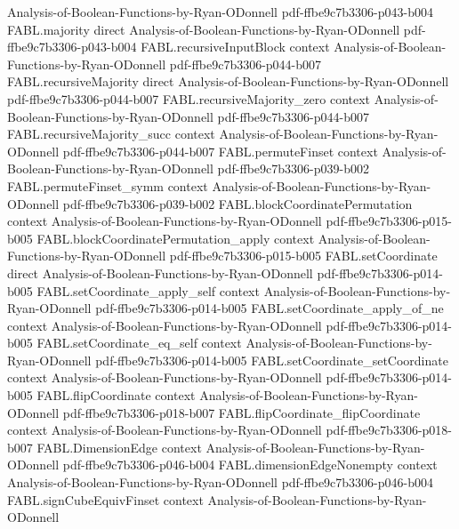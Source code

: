\begin{theorem}
  {Analysis-of-Boolean-Functions-by-Ryan-ODonnell}
  {pdf-ffbe9c7b3306-p043-b004}
\proofstep
  {FABL.majority}
  {direct}
  {Analysis-of-Boolean-Functions-by-Ryan-ODonnell}
  {pdf-ffbe9c7b3306-p043-b004}
\proofstep
  {FABL.recursiveInputBlock}
  {context}
  {Analysis-of-Boolean-Functions-by-Ryan-ODonnell}
  {pdf-ffbe9c7b3306-p044-b007}
\proofstep
  {FABL.recursiveMajority}
  {direct}
  {Analysis-of-Boolean-Functions-by-Ryan-ODonnell}
  {pdf-ffbe9c7b3306-p044-b007}
\proofstep
  {FABL.recursiveMajority_zero}
  {context}
  {Analysis-of-Boolean-Functions-by-Ryan-ODonnell}
  {pdf-ffbe9c7b3306-p044-b007}
\proofstep
  {FABL.recursiveMajority_succ}
  {context}
  {Analysis-of-Boolean-Functions-by-Ryan-ODonnell}
  {pdf-ffbe9c7b3306-p044-b007}
\proofstep
  {FABL.permuteFinset}
  {context}
  {Analysis-of-Boolean-Functions-by-Ryan-ODonnell}
  {pdf-ffbe9c7b3306-p039-b002}
\proofstep
  {FABL.permuteFinset_symm}
  {context}
  {Analysis-of-Boolean-Functions-by-Ryan-ODonnell}
  {pdf-ffbe9c7b3306-p039-b002}
\proofstep
  {FABL.blockCoordinatePermutation}
  {context}
  {Analysis-of-Boolean-Functions-by-Ryan-ODonnell}
  {pdf-ffbe9c7b3306-p015-b005}
\proofstep
  {FABL.blockCoordinatePermutation_apply}
  {context}
  {Analysis-of-Boolean-Functions-by-Ryan-ODonnell}
  {pdf-ffbe9c7b3306-p015-b005}
\proofstep
  {FABL.setCoordinate}
  {direct}
  {Analysis-of-Boolean-Functions-by-Ryan-ODonnell}
  {pdf-ffbe9c7b3306-p014-b005}
\proofstep
  {FABL.setCoordinate_apply_self}
  {context}
  {Analysis-of-Boolean-Functions-by-Ryan-ODonnell}
  {pdf-ffbe9c7b3306-p014-b005}
\proofstep
  {FABL.setCoordinate_apply_of_ne}
  {context}
  {Analysis-of-Boolean-Functions-by-Ryan-ODonnell}
  {pdf-ffbe9c7b3306-p014-b005}
\proofstep
  {FABL.setCoordinate_eq_self}
  {context}
  {Analysis-of-Boolean-Functions-by-Ryan-ODonnell}
  {pdf-ffbe9c7b3306-p014-b005}
\proofstep
  {FABL.setCoordinate_setCoordinate}
  {context}
  {Analysis-of-Boolean-Functions-by-Ryan-ODonnell}
  {pdf-ffbe9c7b3306-p014-b005}
\proofstep
  {FABL.flipCoordinate}
  {context}
  {Analysis-of-Boolean-Functions-by-Ryan-ODonnell}
  {pdf-ffbe9c7b3306-p018-b007}
\proofstep
  {FABL.flipCoordinate_flipCoordinate}
  {context}
  {Analysis-of-Boolean-Functions-by-Ryan-ODonnell}
  {pdf-ffbe9c7b3306-p018-b007}
\proofstep
  {FABL.DimensionEdge}
  {context}
  {Analysis-of-Boolean-Functions-by-Ryan-ODonnell}
  {pdf-ffbe9c7b3306-p046-b004}
\proofstep
  {FABL.dimensionEdgeNonempty}
  {context}
  {Analysis-of-Boolean-Functions-by-Ryan-ODonnell}
  {pdf-ffbe9c7b3306-p046-b004}
\proofstep
  {FABL.signCubeEquivFinset}
  {context}
  {Analysis-of-Boolean-Functions-by-Ryan-ODonnell}

\end{theorem}
